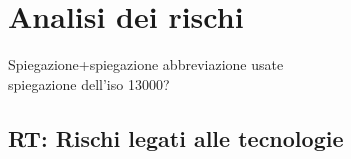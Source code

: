 
\begin{comment}
\begin{table}[h!]
\centering
\renewcommand{\arraystretch}{1.5} %
\begin{tabularx}{\textwidth}{|X|X|}\hline
\rowcolor[HTML]{FFD700} 
\multicolumn{2}{|c|}{\textbf{Tipologia del rischio}} \\ \hline
\textbf{Descrizione} & Descrizione del rischio. \\ \hline
\textbf{Probabilità di occorrenza} & Probabilità di occorrenza (Alta/Media/Bassa) \\ \hline
\textbf{Pericolosità} & Pericolosità(Alta/Media/Bassa) \\ \hline
\textbf{Conseguenze} & Conseguenze del rischio \\ \hline
\textbf{Mitigazioni possibili} & Conseguenze prese \\ \hline
\end{tabularx}
\caption{\textbf{Tipologia del rischio con il numero identificativo}: Descrizione rischio}
\end{table}
\end{comment}

\section{Analisi dei rischi}
\label{sec:analisi_rischi}

Spiegazione+spiegazione abbreviazione usate\\
spiegazione dell'iso 13000?

\subsection{RT: Rischi legati alle tecnologie}

